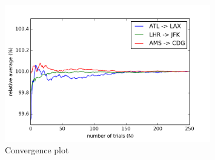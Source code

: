 \begin{figure}
\centering
\includegraphics[width=0.8\textwidth]{figures/ConvergencePlot_multiple}
\caption{Convergence plot}
\label{fig:ConvergencePlotMultiple}
\end{figure}


